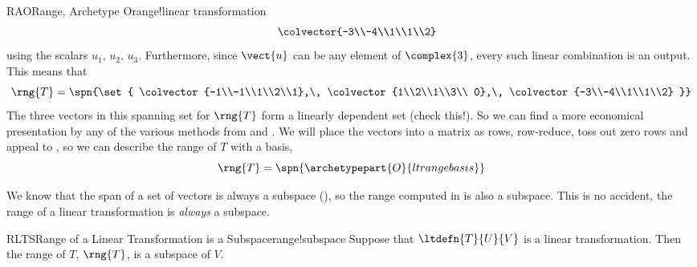 \begin{example}{RAO}{Range, Archetype O}{range!linear transformation}
\begin{align*}
&&
\colvector{-3\\-4\\1\\1\\2}
\end{align*}
%
using the scalars $u_1,\,u_2,\,u_3$.  Furthermore, since $\vect{u}$ can be any element of $\complex{3}$, every such linear combination is an output.  This means that
%
\begin{equation*}
\rng{T}=\spn{\set{
\colvector{-1\\-1\\1\\2\\1},\,
\colvector{1\\2\\1\\3\\ 0},\,
\colvector{-3\\-4\\1\\1\\2}
}}
\end{equation*}
%
The three vectors in this spanning set for $\rng{T}$ form a linearly dependent set (check this!).  So we can find a more economical presentation by any of the various methods from  and .  We will place the vectors into a matrix as rows, row-reduce, toss out zero rows and appeal to , so we can describe the range of $T$ with a basis,
%
\begin{equation*}
\rng{T}=\spn{\archetypepart{O}{ltrangebasis}}
\end{equation*}
%
\end{example}
%
We know that the span of a set of vectors is always a subspace (), so the range computed in  is also a subspace.  This is no accident, the range of a linear transformation is {\em always} a subspace.
%
%
\begin{theorem}{RLTS}{Range of a Linear Transformation is a Subspace}{range!subspace}
Suppose that $\ltdefn{T}{U}{V}$ is a linear transformation.  Then the range of $T$, $\rng{T}$, is a subspace of $V$.
\end{theorem}
%
